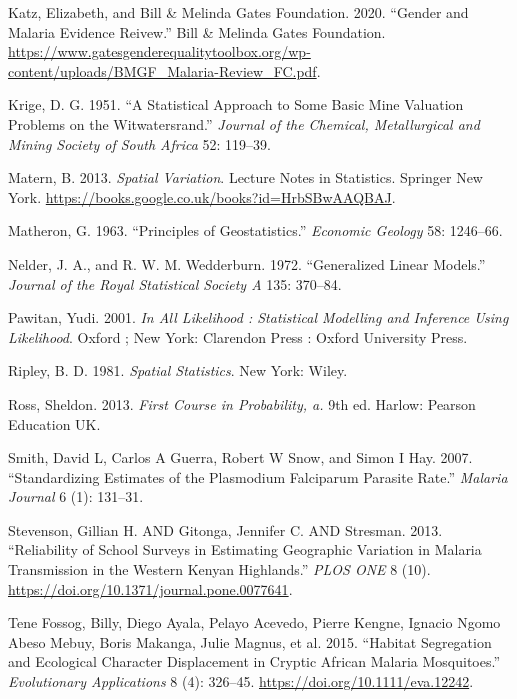 \documentclass[
  letterpaper,
]{krantz}
\newlength{\cslhangindent}
\newlength{\cslentryspacingunit} %
\newenvironment{CSLReferences}[2] %
 {%
  \setlength{\parindent}{0pt}
  \ifodd #1
  \let\oldpar\par
  \def\par{\hangindent=\cslhangindent\oldpar}
  \fi
  \setlength{\parskip}{#2\cslentryspacingunit}
 }%
 {}
\begin{document}
\begin{CSLReferences}{1}{0}
\leavevmode{}%
Katz, Elizabeth, and Bill \& Melinda Gates Foundation. 2020. {``Gender
and Malaria Evidence Reivew.''} Bill \& Melinda Gates Foundation.
\url{https://www.gatesgenderequalitytoolbox.org/wp-content/uploads/BMGF_Malaria-Review_FC.pdf}.

\leavevmode{}%
Krige, D. G. 1951. {``A Statistical Approach to Some Basic Mine
Valuation Problems on the Witwatersrand.''} \emph{Journal of the
Chemical, Metallurgical and Mining Society of South Africa} 52: 119--39.

\leavevmode{}%
Matern, B. 2013. \emph{Spatial Variation}. Lecture Notes in Statistics.
Springer New York.
\url{https://books.google.co.uk/books?id=HrbSBwAAQBAJ}.

\leavevmode{}%
Matheron, G. 1963. {``Principles of Geostatistics.''} \emph{Economic
Geology} 58: 1246--66.

\leavevmode{}%
Nelder, J. A., and R. W. M. Wedderburn. 1972. {``Generalized Linear
Models.''} \emph{Journal of the Royal Statistical Society A} 135:
370--84.

\leavevmode{}%
Pawitan, Yudi. 2001. \emph{In All Likelihood : Statistical Modelling and
Inference Using Likelihood}. Oxford ; New York: Clarendon Press : Oxford
University Press.

\leavevmode{}%
Ripley, B. D. 1981. \emph{Spatial Statistics}. New York: Wiley.

\leavevmode{}%
Ross, Sheldon. 2013. \emph{First Course in Probability, a.} 9th ed.
Harlow: Pearson Education UK.

\leavevmode{}%
Smith, David L, Carlos A Guerra, Robert W Snow, and Simon I Hay. 2007.
{``Standardizing Estimates of the Plasmodium Falciparum Parasite
Rate.''} \emph{Malaria Journal} 6 (1): 131--31.

\leavevmode{}%
Stevenson, Gillian H. AND Gitonga, Jennifer C. AND Stresman. 2013.
{``Reliability of School Surveys in Estimating Geographic Variation in
Malaria Transmission in the Western Kenyan Highlands.''} \emph{PLOS ONE}
8 (10). \url{https://doi.org/10.1371/journal.pone.0077641}.

\leavevmode{}%
Tene Fossog, Billy, Diego Ayala, Pelayo Acevedo, Pierre Kengne, Ignacio
Ngomo Abeso Mebuy, Boris Makanga, Julie Magnus, et al. 2015. {``Habitat
Segregation and Ecological Character Displacement in Cryptic African
Malaria Mosquitoes.''} \emph{Evolutionary Applications} 8 (4): 326--45.
\url{https://doi.org/10.1111/eva.12242}.


\end{CSLReferences}
\end{document}
